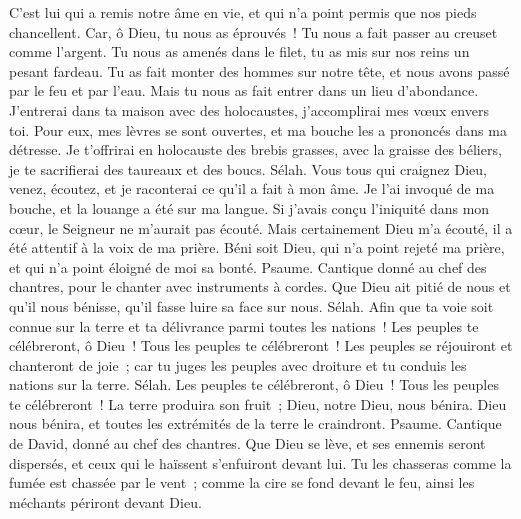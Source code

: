 \begin{multicols}{2}
C'est lui qui a remis notre âme en vie, et qui n'a point permis que nos pieds chancellent.
Car, ô Dieu, tu nous as éprouvés~! Tu nous a fait passer au creuset comme l'argent.
Tu nous as amenés dans le filet, tu as mis sur nos reins un pesant fardeau.
Tu as fait monter des hommes sur notre tête, et nous avons passé par le feu et par l'eau. Mais tu nous as fait entrer dans un lieu d'abondance.
J'entrerai dans ta maison avec des holocaustes, j'accomplirai mes vœux envers toi.
Pour eux, mes lèvres se sont ouvertes, et ma bouche les a prononcés dans ma détresse.
Je t'offrirai en holocauste des brebis grasses, avec la graisse des béliers, je te sacrifierai des taureaux et des boucs. Sélah.
Vous tous qui craignez Dieu, venez, écoutez, et je raconterai ce qu'il a fait à mon âme.
Je l'ai invoqué de ma bouche, et la louange a été sur ma langue.
Si j'avais conçu l'iniquité dans mon cœur, le Seigneur ne m'aurait pas écouté.
Mais certainement Dieu m'a écouté, il a été attentif à la voix de ma prière.
Béni soit Dieu, qui n'a point rejeté ma prière, et qui n'a point éloigné de moi sa bonté.
\VerseOne{}Psaume. Cantique donné au chef des chantres, pour le chanter avec instruments à cordes.
Que Dieu ait pitié de nous et qu'il nous bénisse, qu'il fasse luire sa face sur nous. Sélah.
Afin que ta voie soit connue sur la terre et ta délivrance parmi toutes les nations~!
Les peuples te célébreront, ô Dieu~! Tous les peuples te célébreront~!
Les peuples se réjouiront et chanteront de joie~; car tu juges les peuples avec droiture et tu conduis les nations sur la terre. Sélah.
Les peuples te célébreront, ô Dieu~! Tous les peuples te célébreront~!
La terre produira son fruit~; Dieu, notre Dieu, nous bénira.
Dieu nous bénira, et toutes les extrémités de la terre le craindront.
\VerseOne{}Psaume. Cantique de David, donné au chef des chantres.
Que Dieu se lève, et ses ennemis seront dispersés, et ceux qui le haïssent s'enfuiront devant lui.
Tu les chasseras comme la fumée est chassée par le vent~; comme la cire se fond devant le feu, ainsi les méchants périront devant Dieu.

\end{multicols}
